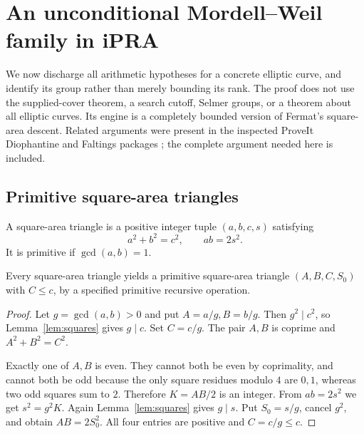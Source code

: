 \section{An unconditional Mordell--Weil family in iPRA}
\label{sec:unconditional}

We now discharge all arithmetic hypotheses for a concrete elliptic curve,
and identify its group rather than merely bounding its rank.
The proof does not use the supplied-cover theorem, a search cutoff,
Selmer groups, or a theorem about all elliptic curves.
Its engine is a completely bounded version of Fermat's square-area descent.
Related arguments were present in the inspected ProveIt Diophantine and
Faltings packages \cite{proveit-geometry,proveit-fermat};
the complete argument needed here is included.

\subsection{Primitive square-area triangles}

\begin{definition}
A square-area triangle is a positive integer tuple $(a,b,c,s)$ satisfying
\[
       a^2+b^2=c^2,\qquad ab=2s^2.
 \tag{6.1}\label{eq:triangle}
\]
It is primitive if $\gcd(a,b)=1$.
\end{definition}

\begin{lemma}[Normalization]\label{lem:normal-triangle}
Every square-area triangle yields a primitive square-area triangle
$(A,B,C,S_0)$ with $C\le c$, by a specified primitive recursive operation.
\end{lemma}
\begin{proof}
Let $g=\gcd(a,b)>0$ and put $A=a/g,B=b/g$.
Then $g^2\mid c^2$, so Lemma~\ref{lem:squares} gives $g\mid c$.
Set $C=c/g$. The pair $A,B$ is coprime and
$A^2+B^2=C^2$.

Exactly one of $A,B$ is even. They cannot both be even by coprimality,
and cannot both be odd because the only square residues modulo $4$ are
$0,1$, whereas two odd squares sum to $2$. Therefore $K=AB/2$ is an
integer. From $ab=2s^2$ we get $s^2=g^2K$.
Again Lemma~\ref{lem:squares} gives $g\mid s$. Put $S_0=s/g$,
cancel $g^2$, and obtain $AB=2S_0^2$.
All four entries are positive and $C=c/g\le c$.
\end{proof}

